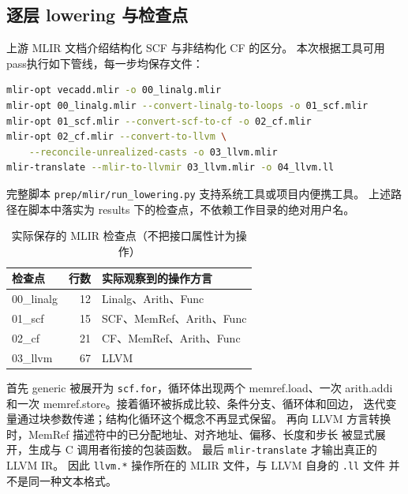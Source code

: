 \documentclass[UTF8,a4paper,11pt]{ctexart}
\begin{document}
\subsection{逐层 lowering 与检查点}
上游 MLIR 文档介绍结构化 SCF 与非结构化 CF 的区分\cite{scfref}。
本次根据工具可用 pass\cite{mlirpasses}执行如下管线，每一步均保存文件：
\par\vspace{0.7\baselineskip}\noindent\begin{minipage}[t]{\linewidth}
\begin{lstlisting}[language=bash]
mlir-opt vecadd.mlir -o 00_linalg.mlir
mlir-opt 00_linalg.mlir --convert-linalg-to-loops -o 01_scf.mlir
mlir-opt 01_scf.mlir --convert-scf-to-cf -o 02_cf.mlir
mlir-opt 02_cf.mlir --convert-to-llvm \
    --reconcile-unrealized-casts -o 03_llvm.mlir
mlir-translate --mlir-to-llvmir 03_llvm.mlir -o 04_llvm.ll
\end{lstlisting}
\end{minipage}\par\vspace{0.5\baselineskip}
完整脚本 \texttt{prep/mlir/run\_lowering.py} 支持系统工具或项目内便携工具。
上述路径在脚本中落实为 results 下的检查点，不依赖工作目录的绝对用户名。

\begin{table}[htbp]
\centering\small
\begin{tabular}{lrl}
\toprule
检查点 & 行数 & 实际观察到的操作方言\\
\midrule
00\_linalg & 12 & Linalg、Arith、Func\\
01\_scf & 15 & SCF、MemRef、Arith、Func\\
02\_cf & 21 & CF、MemRef、Arith、Func\\
03\_llvm & 67 & LLVM\\
\bottomrule
\end{tabular}
\caption{实际保存的 MLIR 检查点（不把接口属性计为操作）}
\end{table}

首先 generic 被展开为 \texttt{scf.for}，循环体出现两个 memref.load、一次
arith.addi 和一次 memref.store。接着循环被拆成比较、条件分支、循环体和回边，
迭代变量通过块参数传递；结构化循环这个概念不再显式保留。
再向 LLVM 方言转换时，MemRef 描述符中的已分配地址、对齐地址、偏移、长度和步长
被显式展开，生成与 C 调用者衔接的包装函数。
最后 \texttt{mlir-translate} 才输出真正的 LLVM IR。
因此 \texttt{llvm.*} 操作所在的 MLIR 文件，与 LLVM 自身的 \texttt{.ll} 文件
并不是同一种文本格式。
\end{document}

